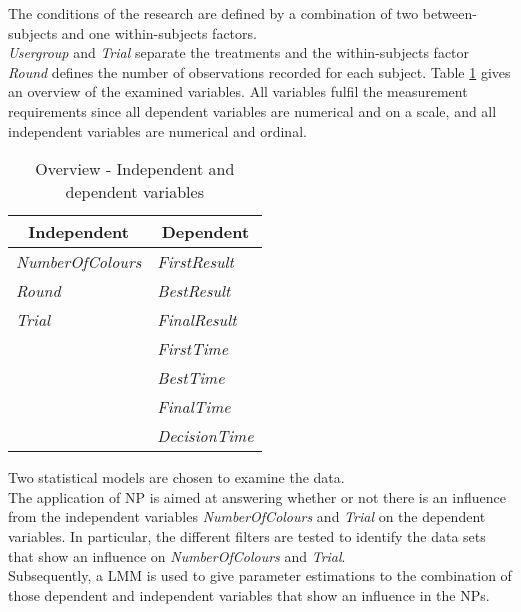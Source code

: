 The conditions of the research are defined by a combination of two between-subjects and one within-subjects factors.\\
\textit{Usergroup} and \textit{Trial} separate the treatments and the within-subjects factor \textit{Round} defines the number of observations recorded for each subject.
Table \ref{tab:OverviewVariables} gives an overview of the examined variables. All variables fulfil the measurement requirements since all dependent variables are numerical and on a scale, and all independent variables are numerical and ordinal. \\
\begin{table}[t]
  \centering
    \begin{tabular}{l|l}
    \toprule
    \multicolumn{1}{c}{Independent}  & \multicolumn{1}{c}{Dependent} \\
    \midrule
    \textit{NumberOfColours} & \textit{FirstResult} \\
    \textit{Round} & \textit{BestResult} \\
    \textit{Trial} & \textit{FinalResult} \\
    \textit{} & \textit{FirstTime} \\
    \textit{} & \textit{BestTime} \\
    \textit{} & \textit{FinalTime} \\
    \textit{} & \textit{DecisionTime} \\
    \bottomrule
    \end{tabular}%
      \caption{Overview - Independent and dependent variables}
    \label{tab:OverviewVariables}%
\end{table}%

Two statistical models are chosen to examine the data.\\
The application of \acf{NP} is aimed at answering whether or not there is an influence from the independent variables \textit{NumberOfColours} and \textit{Trial} on the dependent variables. In particular, the different filters are tested to identify the data sets that show an influence on \textit{NumberOfColours} and \textit{Trial}.\\
Subsequently, a \acf{LMM} is used to give parameter estimations to the combination of those dependent and independent variables that show an influence in the \ac{NP}s.


